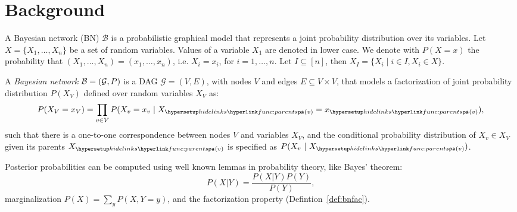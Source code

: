 
\section{Background}
\label{sec:background}

A Bayesian network (BN) $\mathcal{B}$ is a probabilistic graphical model that represents a joint probability distribution over its variables. Let $X = \{X_1,\ldots,X_n\}$ be a set of random variables.
Values of a variable $X_1$ are denoted in lower case.
We denote with $P(X = x)$ the probability that $(X_1,\ldots,X_n) = (x_1,\ldots,x_n)$,
i.e. $X_i = x_i$, for $i =1,\ldots,n$.
Let  $I \subseteq [n]$, then $X_I = \{X_i \mid i \in I, X_i \in X\}$. %

\begin{definition}\label{def:bnfac}
    \ULforem
    A \emph{Bayesian network} $\mathcal{B} = \left( \mathcal{G},P \right)$ is a DAG $\mathcal{G} = (V,E)$, with nodes $V$ and edges $E \subseteq V \times V$, that models a factorization of joint probability distribution $P(X_V)$ defined over random variables $X_V$ as:%
    \begin{equation}
    P(X_V = x_V) = \prod_{v \in V}P(X_v = x_v \mid X_{\myparents(v)}= x_{\myparents(v)}),
    \end{equation}%
    \noindent such that there is a one-to-one correspondence between nodes $V$ and variables $X_V$, and the conditional probability distribution of $X_v \in X_V$ given its parents $X_{\myparents(v)}$ is specified as $P(X_v\ |\ X_{\myparents(v)})$.

\end{definition}

Posterior probabilities can be computed using well known lemmas in probability theory, like Bayes’ theorem:
\[P(X | Y) = \frac{P(X | Y)P(Y)}{P(Y)},\]
marginalization $P(X) = \sum_{y} P(X, Y = y)$, and the factorization property (Defintion~\ref{def:bnfac}).


